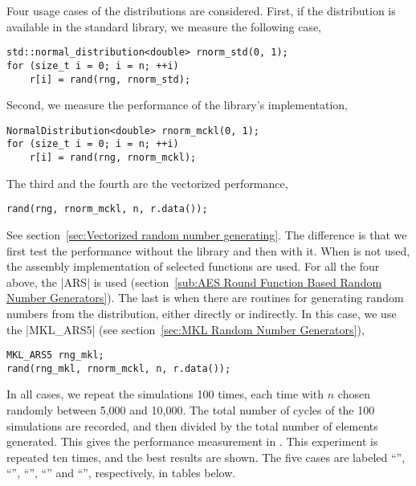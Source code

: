 Four usage cases of the distributions are considered. First, if the
distribution is available in the standard library, we measure the following
case,
\begin{verbatim}
std::normal_distribution<double> rnorm_std(0, 1);
for (size_t i = 0; i = n; ++i)
    r[i] = rand(rng, rnorm_std);
\end{verbatim}
Second, we measure the performance of the library's implementation,
\begin{verbatim}
NormalDistribution<double> rnorm_mckl(0, 1);
for (size_t i = 0; i = n; ++i)
    r[i] = rand(rng, rnorm_mckl);
\end{verbatim}
The third and the fourth are the vectorized performance,
\begin{verbatim}
rand(rng, rnorm_mckl, n, r.data());
\end{verbatim}
See section~\ref{sec:Vectorized random number generating}. The difference is
that we first test the performance without the \mkl \vml library and then with
it. When \mkl \vml is not used, the assembly implementation of selected
functions are used. For all the four above, the |ARS| \rng is used
(section~\ref{sub:AES Round Function Based Random Number Generators}). The last
is when there are \mkl routines for generating random numbers from the
distribution, either directly or indirectly. In this case, we use the
|MKL_ARS5| \rng (see section~\ref{sec:MKL Random Number Generators}),
\begin{verbatim}
MKL_ARS5 rng_mkl;
rand(rng_mkl, rnorm_mckl, n, r.data());
\end{verbatim}
In all cases, we repeat the simulations 100 times, each time with $n$ chosen
randomly between 5,000 and 10,000. The total number of cycles of the 100
simulations are recorded, and then divided by the total number of elements
generated. This gives the performance measurement in \cpe. This experiment is
repeated ten times, and the best results are shown. The five cases are labeled
``\std'', ``\mckl'', ``\vmf'', ``\vml'' and ``\mkl'', respectively, in tables
below.










